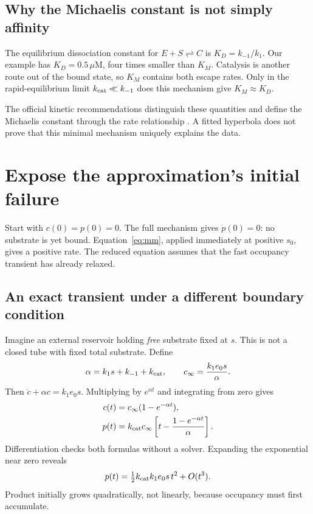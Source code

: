 
\subsection{Why the Michaelis constant is not simply affinity}

The equilibrium dissociation constant for $E+S\rightleftharpoons C$ is $K_D=k_{-1}/k_1$. Our example has $K_D=0.5\,\mu$M, four times smaller than $K_M$. Catalysis is another route out of the bound state, so $K_M$ contains both escape rates. Only in the rapid-equilibrium limit $k_{\rm cat}\ll k_{-1}$ does this mechanism give $K_M\approx K_D$.

The official kinetic recommendations distinguish these quantities and define the Michaelis constant through the rate relationship \cite{kinetics}. A fitted hyperbola does not prove that this minimal mechanism uniquely explains the data.

\section{Expose the approximation's initial failure}

Start with $c(0)=p(0)=0$. The full mechanism gives $\dot p(0)=0$: no substrate is yet bound. Equation~\ref{eq:mm}, applied immediately at positive $s_0$, gives a positive rate. The reduced equation assumes that the fast occupancy transient has already relaxed.

\subsection{An exact transient under a different boundary condition}

Imagine an external reservoir holding \emph{free} substrate fixed at $s$. This is not a closed tube with fixed total substrate. Define
\begin{equation}
\alpha=k_1s+k_{-1}+k_{\rm cat},\qquad
c_\infty=\frac{k_1e_0s}{\alpha}.
\end{equation}
Then $\dot c+\alpha c=k_1e_0s$. Multiplying by $e^{\alpha t}$ and integrating from zero gives
\begin{align}
c(t)&=c_\infty(1-e^{-\alpha t}),\\
p(t)&=k_{\rm cat}c_\infty
\left[t-\frac{1-e^{-\alpha t}}{\alpha}\right].
\label{eq:clamped}
\end{align}
Differentiation checks both formulas without a solver. Expanding the exponential near zero reveals
\begin{equation}
p(t)=\tfrac12 k_{\rm cat}k_1e_0s\,t^2+O(t^3).
\end{equation}
Product initially grows quadratically, not linearly, because occupancy must first accumulate.


